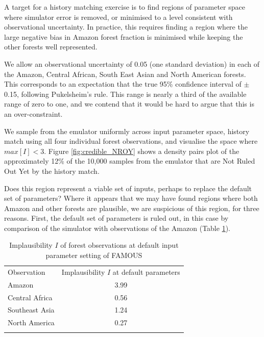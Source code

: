 \documentclass[esd, manuscript]{copernicus}
\begin{document}


A target for a history matching exercise is to find regions of parameter space where simulator error is removed, or minimised to a level consistent with observational uncertainty. In practice, this requires finding a region where the large negative bias in Amazon forest fraction is minimised while keeping the other forests well represented.

We allow an observational uncertainty of 0.05 (one standard deviation) in each of the Amazon, Central African, South East Asian and North American forests. This corresponds to an expectation that the true 95\% confidence interval of $\pm$0.15, following Pukelsheim's rule. This range is nearly a third of the available range of zero to one, and we contend that it would be hard to argue that this is an over-constraint.

We sample from the emulator uniformly across input parameter space, history match using all four individual forest observations, and visualise the space where $max[I] < 3$. Figure \ref{fig:credible_NROY} shows a density pairs plot of the approximately 12\% of the 10,000 samples from the emulator that are Not Ruled Out Yet by the history match.


Does this region represent a viable set of inputs, perhaps to replace the default set of parameters? Where it appears that we may have found regions where both Amazon and other forests are plausible, we are suspicious of this region, for three reasons. First, the default set of parameters is ruled out, in this case by comparison of the simulator with observations of the Amazon (Table \ref{tab:default_parameter_implausibility}).


\begin{table}[t]
\caption{Implausibility $I$ of forest observations at default input parameter setting of FAMOUS}\label{tab:default_parameter_implausibility}
\begin{tabular}{lc}

\tophline
Observation &  Implausibility $I$ at default parameters \\
Amazon & 3.99 \\
Central Africa & 0.56 \\
Southeast Asia & 1.24 \\
North America & 0.27 \\
\bottomhline
\end{tabular}
\belowtable{} %
\end{table}
\end{document}
